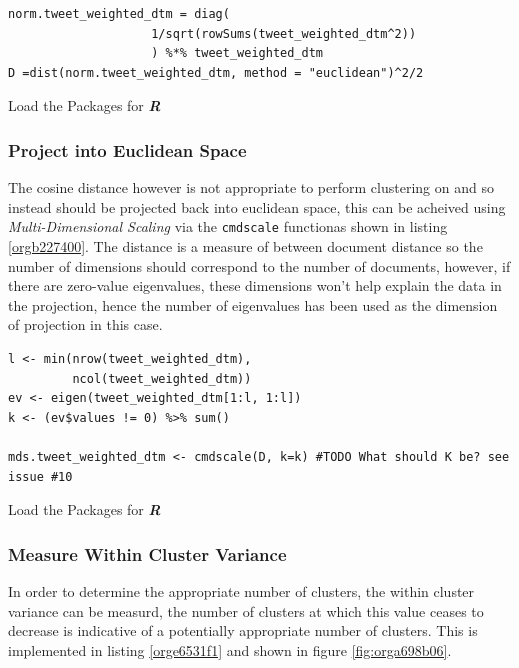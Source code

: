 \documentclass[11pt]{article}
\begin{document}
\begin{listing}[htbp]
\begin{verbatim}
norm.tweet_weighted_dtm = diag(
                    1/sqrt(rowSums(tweet_weighted_dtm^2))
                    ) %*% tweet_weighted_dtm
D =dist(norm.tweet_weighted_dtm, method = "euclidean")^2/2
\end{verbatim}
\caption{\label{org7a1f206}Load the Packages for \textbf{\textbf{\emph{R}}}}
\end{listing}

\subsubsection{Project into Euclidean Space}
\label{sec:org0dede0b}
The cosine distance however is not appropriate to perform clustering on and so instead should be projected back into euclidean space, this can be acheived using \emph{Multi-Dimensional Scaling} via the \texttt{cmdscale} functionas shown in listing \ref{orgb227400}. The distance is a measure of between document distance so the number of dimensions should correspond to the number of documents, however, if there are zero-value eigenvalues, these dimensions won't help explain the data in the projection, hence the number of eigenvalues has been used as the dimension of projection in this case.

\begin{listing}[htbp]
\begin{verbatim}
l <- min(nrow(tweet_weighted_dtm),
         ncol(tweet_weighted_dtm))
ev <- eigen(tweet_weighted_dtm[1:l, 1:l])
k <- (ev$values != 0) %>% sum()

mds.tweet_weighted_dtm <- cmdscale(D, k=k) #TODO What should K be? see issue #10
\end{verbatim}
\caption{\label{orgb227400}Load the Packages for \textbf{\textbf{\emph{R}}}}
\end{listing}

\subsubsection{Measure Within Cluster Variance}
\label{sec:orgc78e726}
In order to determine the appropriate number of clusters, the within cluster
variance can be measurd, the number of clusters at which this value ceases to
decrease is indicative of a potentially appropriate number of clusters. This is
implemented in listing \ref{orge6531f1} and shown in figure \ref{fig:orga698b06}.
\end{document}
